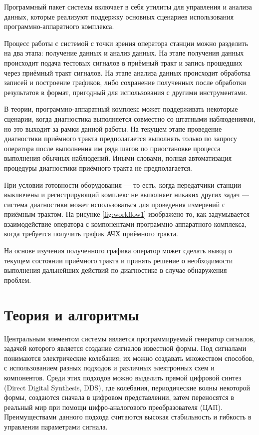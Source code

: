\documentclass{report}
\begin{document}
Программный пакет системы включает в себя утилиты для управления и анализа данных, которые реализуют поддержку основных сценариев использования программно-аппаратного комплекса.

Процесс работы с системой с точки зрения оператора станции можно разделить на два этапа: получение данных и анализ данных. На этапе получения данных происходит подача тестовых сигналов в приёмный тракт и запись прошедших через приёмный тракт сигналов. На этапе анализа данных происходит обработка записей и построение графиков, либо сохранение полученных после обработки результатов в формат, пригодный для использования с другими инструментами.

В теории, программно-аппаратный комплекс может поддерживать некоторые сценарии, когда диагностика выполняется совместно со штатными наблюдениями, но это выходит за рамки данной работы. На текущем этапе проведение диагностики приёмного тракта предполагается выполнять только по запросу оператора после выполнения им ряда шагов по приостановке процесса выполнения обычных наблюдений. Иными словами, полная автоматизация процедуры диагностики приёмного тракта не предполагается.

При условии готовности оборудования --- то есть, когда передатчики станции выключены и регистрирующий комплекс не выполняет никаких других задач --- система диагностики может использоваться для проведения измерений с приёмным трактом. На рисунке \ref{fig:workflow1} изображено то, как задумывается взаимодействие оператора с компонентами программно-аппаратного комплекса, когда требуется получить график АЧХ приёмного тракта.


На основе изучения полученного графика оператор может сделать вывод о текущем состоянии приёмного тракта и принять решение о необходимости выполнения дальнейших действий по диагностике в случае обнаружения проблем.

\section{Теория и алгоритмы}

Центральным элементом системы является программируемый генератор сигналов, задачей которого является создание сигналов известной формы. Под сигналами понимаются электрические колебания; их можно создавать множеством способов, с использованием разных подходов и различных электронных схем и компонентов. Среди этих подходов можно выделить прямой цифровой синтез (Direct Digital Synthesis, DDS), где колебания, периодические волны некоторой формы, создаются сначала в цифровом представлении, затем переносятся в реальный мир при помощи цифро-аналогового преобразователя (ЦАП). Преимуществами данного подхода считаются высокая стабильность и гибкость в управлении параметрами сигнала.
\end{document}
